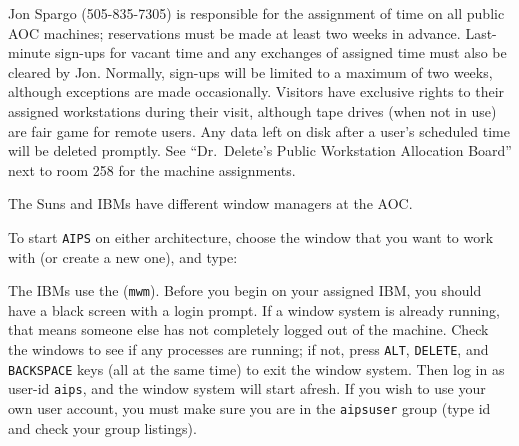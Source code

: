 

   Jon Spargo (505-835-7305) is responsible for the assignment of time
on all public AOC machines; reservations must be made at least two
weeks in advance.  Last-minute sign-ups for vacant time and any
exchanges of assigned time must also be cleared by Jon.  Normally,
sign-ups will be limited to a maximum of two weeks, although
exceptions are made occasionally.  Visitors have exclusive rights to
their assigned workstations during their visit, although tape drives
(when not in use) are fair game for remote users.  Any data left
on disk after a user's scheduled time will be deleted promptly.  See
``Dr.~Delete's Public Workstation Allocation Board'' next to room 258
for the machine assignments.


    The Suns and IBMs have different window managers at the
\hbox{AOC}.

     To start {\tt AIPS} on either architecture, choose the window
that you want to work with (or create a new one), and type:


     The IBMs use the   ({\tt mwm}).
Before you begin on your assigned IBM, you should have a black screen
with a login prompt.  If a window system is already running, that
means someone else has not completely logged out of the machine.
Check the windows to see if any processes are running; if not, press
{\tt ALT}, {\tt DELETE}, and {\tt BACKSPACE} keys (all at the same
time) to exit the window system.  Then log in as user-id {\tt aips},
and the window system will start afresh.  If you wish to use your own
user account, you must make sure you are in the {\tt aipsuser} group
(type {\us id \CR} and check your group listings).

